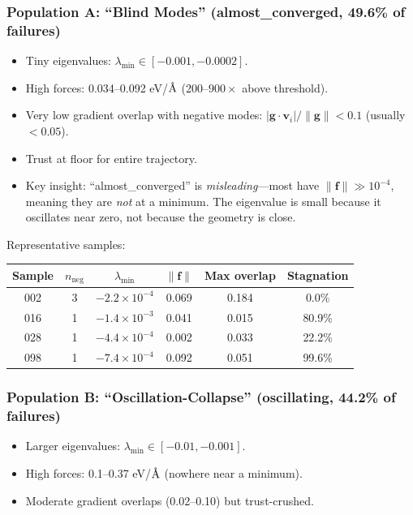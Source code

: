 \documentclass[11pt,a4paper]{article}
\newcommand{\vect}[1]{\mathbf{#1}}
\newcommand{\evec}{\vect{v}}
\newcommand{\eval}{\lambda}
\newcommand{\angstrom}{\text{\r{A}}}
\begin{document}
\subsubsection{Population A: ``Blind Modes'' (almost\_converged, 49.6\% of failures)}

\begin{itemize}
  \item Tiny eigenvalues: $\eval_\text{min} \in [-0.001, -0.0002]$.
  \item High forces: 0.034--0.092 eV/$\angstrom$ (200--$900\times$ above threshold).
  \item Very low gradient overlap with negative modes: $|\vect{g}\cdot\evec_i|/\|\vect{g}\| < 0.1$ (usually $< 0.05$).
  \item Trust at floor for entire trajectory.
  \item Key insight: ``almost\_converged'' is \emph{misleading}---most have $\|\vect{f}\| \gg 10^{-4}$, meaning they are \emph{not} at a minimum. The eigenvalue is small because it oscillates near zero, not because the geometry is close.
\end{itemize}

Representative samples:
\begin{table}[H]
\centering
\small
\begin{tabular}{cccccc}
\toprule
Sample & $n_\text{neg}$ & $\eval_\text{min}$ & $\|\vect{f}\|$ & Max overlap & Stagnation \\
\midrule
002 & 3 & $-2.2\times10^{-4}$ & 0.069 & 0.184 & 0.0\% \\
016 & 1 & $-1.4\times10^{-3}$ & 0.041 & 0.015 & 80.9\% \\
028 & 1 & $-4.4\times10^{-4}$ & 0.002 & 0.033 & 22.2\% \\
098 & 1 & $-7.4\times10^{-4}$ & 0.092 & 0.051 & 99.6\% \\
\bottomrule
\end{tabular}
\end{table}

\subsubsection{Population B: ``Oscillation-Collapse'' (oscillating, 44.2\% of failures)}

\begin{itemize}
  \item Larger eigenvalues: $\eval_\text{min} \in [-0.01, -0.001]$.
  \item High forces: 0.1--0.37 eV/$\angstrom$ (nowhere near a minimum).
  \item Moderate gradient overlaps (0.02--0.10) but trust-crushed.
\end{itemize}
\end{document}
